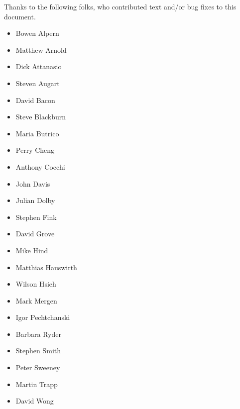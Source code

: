 Thanks to the following folks, who contributed text and/or bug fixes to
this document.

\begin{itemize}
\item Bowen Alpern
\item Matthew Arnold
\item Dick Attanasio
\item Steven Augart
\item David Bacon
\item Steve Blackburn
\item Maria Butrico
\item Perry Cheng
\item Anthony Cocchi
\item John Davis
\item Julian Dolby
\item Stephen Fink
\item David Grove
\item Mike Hind
\item Matthias Hauswirth
\item Wilson Hsieh
\item Mark Mergen
\item Igor Pechtchanski
\item Barbara Ryder
\item Stephen Smith
\item Peter Sweeney
\item Martin Trapp
\item David Wong
\end{itemize}
